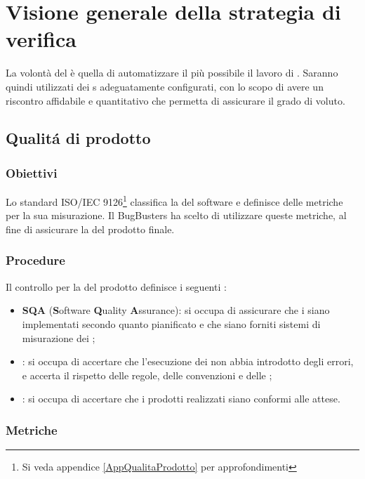\newpage
\section{Visione generale della strategia di verifica}
La volontà del  è quella di automatizzare il più possibile il lavoro di . Saranno quindi utilizzati dei s adeguatamente configurati, con lo scopo di avere un riscontro affidabile e quantitativo che permetta di assicurare il grado di  voluto. 

\subsection{Qualit\'a di prodotto}
\subsubsection{Obiettivi}
Lo standard ISO/IEC 9126\footnote{Si veda appendice \ref{AppQualitaProdotto} per approfondimenti} classifica la  del software e definisce delle metriche per la sua misurazione. Il  BugBusters ha scelto di utilizzare queste metriche, al fine di assicurare la  del prodotto finale.

\subsubsection{Procedure}
Il controllo per la  del prodotto definisce i seguenti :
\begin{itemize}
	\item \textbf{SQA} (\textbf{S}oftware \textbf{Q}uality \textbf{A}ssurance): si occupa di assicurare che i  siano implementati secondo quanto pianificato e che siano forniti sistemi di misurazione dei ;
	\item \textbf{}: si occupa di accertare che l'esecuzione dei  non abbia introdotto degli errori, e accerta il rispetto delle regole, delle convenzioni e delle ;
	\item \textbf{}: si occupa di accertare che i prodotti realizzati siano conformi alle attese.
\end{itemize}

\subsubsection{Metriche}\label{MetricheSoftware}
